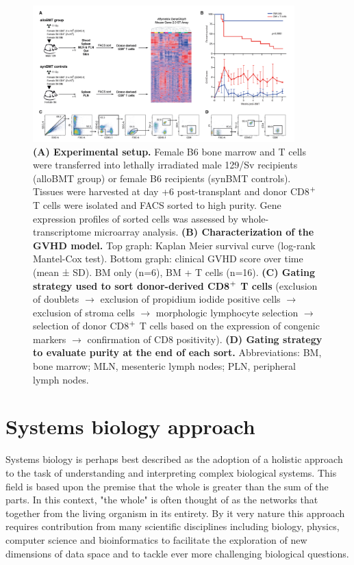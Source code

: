 \begin{figure}[H] 
    \centering
    \includegraphics[width=0.9\textwidth]{Figures/Chapter1/B6_129.png}
   \caption{\small{\textbf{(A) Experimental setup.} Female B6 bone marrow and T cells were transferred into lethally irradiated male 129/Sv recipients (alloBMT group) or female B6 recipients (synBMT controls). Tissues were harvested at day +6 post-transplant and donor CD8$\textsuperscript{+}$ T cells were isolated and FACS sorted to high purity. Gene expression profiles of sorted cells was assessed by whole-transcriptome microarray analysis. \textbf{(B) Characterization of the GVHD model.} Top graph: Kaplan Meier survival curve (log-rank Mantel-Cox test). Bottom graph: clinical GVHD score over time (mean ± SD). BM only (n=6), BM + T cells (n=16). \textbf{(C) Gating strategy used to sort donor-derived CD8$\textsuperscript{+}$ T cells} (exclusion of doublets $\to$ exclusion of propidium iodide positive cells $\to$ exclusion of stroma cells $\to$ morphologic lymphocyte selection $\to$ selection of donor CD8$\textsuperscript{+}$ T cells based on the expression of congenic markers $\to$ confirmation of CD8 positivity). \textbf{(D) Gating strategy to evaluate purity at the end of each sort.} Abbreviations: BM, bone marrow; MLN, mesenteric lymph nodes; PLN, peripheral lymph nodes.} }
    \label{fig:2}
\end{figure}


\section{Systems biology approach}

Systems biology is perhaps best described as the adoption of a holistic approach to the task of understanding and interpreting complex biological systems. This field is based upon the premise that the whole is greater than the sum of the parts. In this context, "the whole" is often thought of as the networks that together from the living organism in its entirety. By it very nature this approach requires contribution from many scientific disciplines including biology, physics, computer science and bioinformatics to facilitate the exploration of new dimensions of data space and to tackle ever more challenging biological questions. 


